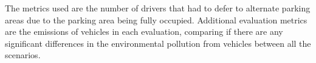 
The metrics used are the number of drivers that had to defer to alternate parking areas due to the parking area being fully occupied. Additional evaluation metrics are the emissions of vehicles in each evaluation, comparing if there are any significant differences in the environmental pollution from vehicles between all the scenarios.